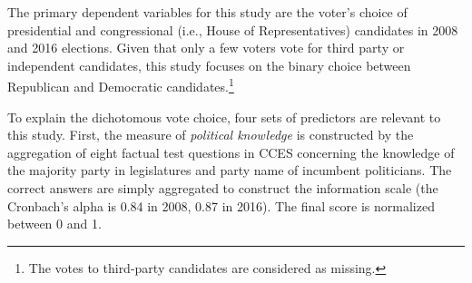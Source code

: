 \documentclass[doc,natbib,12pt]{apa6}\usepackage[]{graphicx}\usepackage[]{color}
\begin{document}
    \par The primary dependent variables for this study are the voter's choice of presidential and congressional (i.e., House of Representatives) candidates in 2008 and 2016 elections. Given that only a few voters vote for third party or independent candidates, this study focuses on the binary choice between Republican and Democratic candidates.\footnote{The votes to third-party candidates are considered as missing.} 
    
    \par To explain the dichotomous vote choice, four sets of predictors are relevant to this study. First, the measure of \textit{political knowledge} is constructed by the aggregation of eight factual test questions in CCES concerning the knowledge of the majority party in legislatures and party name of incumbent politicians. The correct answers are simply aggregated to construct the information scale (the Cronbach's alpha is 0.84 in 2008, 0.87 in 2016). The final score is normalized between 0 and 1.  
    
\end{document}
